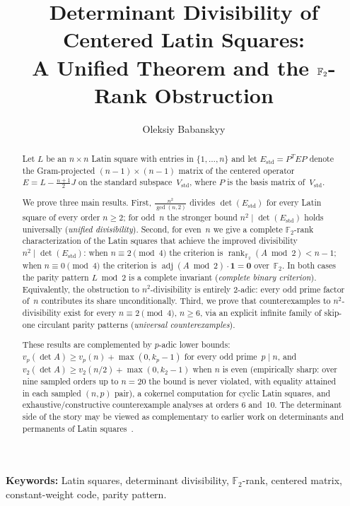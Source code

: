 \documentclass[11pt,a4paper]{article}
\title{Determinant Divisibility of Centered Latin Squares:\\
  A Unified Theorem and the $\FF_2$-Rank Obstruction}
\author{Oleksiy Babanskyy}
\date{}
\newcommand{\FF}{\mathbb{F}}
\newcommand{\one}{\mathbf{1}}
\newcommand{\rank}{\operatorname{rank}}
\newcommand{\adj}{\operatorname{adj}}
\newcommand{\Estd}{E_{\mathrm{std}}}
\newcommand{\Vstd}{V_{\mathrm{std}}}
\begin{document}
\maketitle

\begin{abstract}
Let $L$ be an $n\times n$ Latin square with entries in $\{1,\dots,n\}$
and let $\Estd = P^TEP$ denote the Gram-projected
$(n{-}1)\times(n{-}1)$ matrix of the centered operator
$E=L-\tfrac{n+1}{2}J$ on the standard subspace~$\Vstd$,
where $P$ is the basis matrix of~$\Vstd$.

We prove three main results.
First, $\frac{n^2}{\gcd(n,2)}$ divides $\det(\Estd)$ for every Latin
square of every order $n\ge 2$; for odd~$n$ the stronger bound
$n^2\mid\det(\Estd)$ holds universally (\emph{unified divisibility}).
Second, for even~$n$ we give a complete $\FF_2$-rank characterization
of the Latin squares that achieve the improved divisibility
$n^2\mid\det(\Estd)$: when $n\equiv 2\pmod{4}$ the criterion is
$\rank_{\FF_2}(A\bmod 2)<n-1$; when $n\equiv 0\pmod{4}$ the criterion
is $\adj(A\bmod 2)\cdot\one=\mathbf{0}$ over~$\FF_2$.
In both cases the parity pattern $L\bmod 2$ is a complete invariant
(\emph{complete binary criterion}).  Equivalently, the obstruction to
$n^2$-divisibility is entirely $2$-adic: every odd prime factor of~$n$
contributes its share unconditionally.
Third, we prove that counterexamples to $n^2$-divisibility exist for
every $n\equiv 2\pmod{4}$, $n\ge 6$, via an explicit infinite family
of skip-one circulant parity patterns (\emph{universal counterexamples}).

These results are complemented by $p$-adic lower bounds:
$v_p(\det A)\ge v_p(n)+\max(0,k_p-1)$ for every odd prime~$p\mid n$,
and $v_2(\det A)\ge v_2(n/2)+\max(0,k_2-1)$ when $n$ is even
(empirically sharp: over nine sampled orders up to $n=20$ the bound is never
violated, with equality attained in each sampled $(n,p)$ pair),
a cokernel computation for cyclic
Latin squares, and exhaustive/constructive counterexample analyses
at orders $6$ and~$10$.  The determinant side of the story may be viewed
as complementary to earlier work on determinants and permanents of Latin
squares~\cite{FordJohnson96,DJW16}.
\end{abstract}

\bigskip
\noindent
\textbf{Keywords:} Latin squares, determinant divisibility, $\FF_2$-rank,
centered matrix, constant-weight code, parity pattern.
\end{document}
